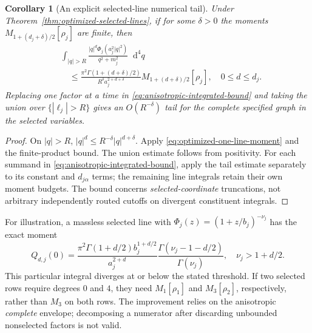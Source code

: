 \documentclass[final,5p,times,twocolumn,numbers,nopreprintline]{elsarticle}
\numberwithin{equation}{section}
\newtheorem{corollary}[theorem]{Corollary}
\theoremstyle{definition}
\theoremstyle{remark}
\newcommand{\dd}{\mathop{}\!\mathrm d}
\newcommand{\Ph}{\Phi}
\begin{document}
\begin{corollary}[An explicit selected-line numerical tail]
\label{cor:optimized-selected-tail}
Under Theorem~\ref{thm:optimized-selected-lines}, if for some
$\delta>0$ the moments
$M_{1+(d_j+\delta)/2}[\rho_j]$ are finite, then
\begin{equation}
 \begin{aligned}
 &\int_{|q|>R}\frac{|q|^d\Ph_j(a_j^2|q|^2)}{q^2+m_j^2}
  \dd^4q\\
 &\quad\leq \frac{\pi^2\Gamma(1+(d+\delta)/2)}
                       {R^\delta a_j^{2+d+\delta}}
       M_{1+(d+\delta)/2}[\rho_j],
 \quad 0\leq d\leq d_j.
 \end{aligned}
 \label{eq:optimized-tail-bound}
\end{equation}
Replacing one factor at a time in
\eqref{eq:anisotropic-integrated-bound} and taking the union over
$\{|\ell_j|>R\}$ gives an $O(R^{-\delta})$ tail for the complete
specified graph in the selected variables.
\end{corollary}
\begin{proof}
On $|q|>R$, $|q|^d\leq R^{-\delta}|q|^{d+\delta}$.
Apply \eqref{eq:optimized-one-line-moment} and the finite-product
bound. The union estimate follows from positivity. For each summand in
\eqref{eq:anisotropic-integrated-bound}, apply the tail estimate
separately to its constant and $d_{j\alpha}$ terms; the remaining
line integrals retain their own moment budgets. The bound concerns
\emph{selected-coordinate} truncations, not arbitrary independently
routed cutoffs on divergent constituent integrals.
\end{proof}

For illustration, a massless selected line with
$\Ph_j(z)=(1+z/b_j)^{-\nu_j}$ has the exact moment
\[
 Q_{d,j}(0)=\frac{\pi^2\Gamma(1+d/2)b_j^{1+d/2}}
    {a_j^{2+d}}
 \frac{\Gamma(\nu_j-1-d/2)}{\Gamma(\nu_j)},
 \quad \nu_j>1+d/2.
\]
This particular integral diverges at or below the stated threshold.
If two selected rows require degrees $0$ and $4$, they need
$M_1[\rho_1]$ and $M_3[\rho_2]$, respectively, rather than
$M_3$ on both rows. The improvement relies on the anisotropic
\emph{complete} envelope; decomposing a numerator after discarding
unbounded nonselected factors is not valid.
\end{document}

